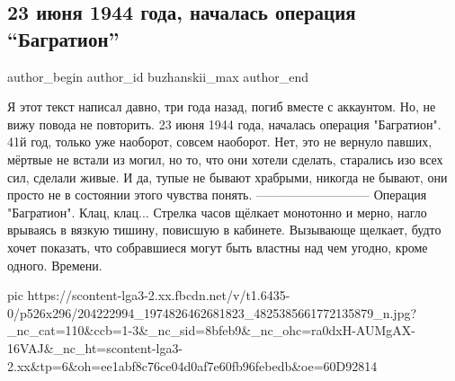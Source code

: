  
 
 
 
 
 
\subsection{23 июня 1944 года, началась операция \enquote{Багратион}}
\label{sec:23_06_2021.fb.buzhanskii_max.1.operacia_bagration}
\ifcmt
 author_begin
   author_id buzhanskii_max
 author_end
\fi

Я этот текст написал давно, три года назад, погиб вместе с аккаунтом.
Но, не вижу повода не повторить.
23 июня 1944 года, началась операция "Багратион".
41й год, только уже наоборот, совсем наоборот.
Нет, это не вернуло павших, мёртвые не встали из могил, но то, что они хотели сделать, старались изо всех сил, сделали живые.
И да, тупые не бывают храбрыми, никогда не бывают, они просто не в состоянии этого чувства понять.
---------------------------
Операция "Багратион".
Клац, клац...
Стрелка часов щёлкает монотонно и мерно, нагло врываясь в вязкую тишину, повисшую в кабинете.
Вызывающе щелкает, будто хочет показать, что собравшиеся могут быть властны над чем угодно, кроме одного.
Времени.

\ifcmt
  pic https://scontent-lga3-2.xx.fbcdn.net/v/t1.6435-0/p526x296/204222994_1974826462681823_4825385661772135879_n.jpg?_nc_cat=110&ccb=1-3&_nc_sid=8bfeb9&_nc_ohc=ra0dxH-AUMgAX-16VAJ&_nc_ht=scontent-lga3-2.xx&tp=6&oh=ee1abf8c76ce04d0af7e60fb96febedb&oe=60D92814
\fi

